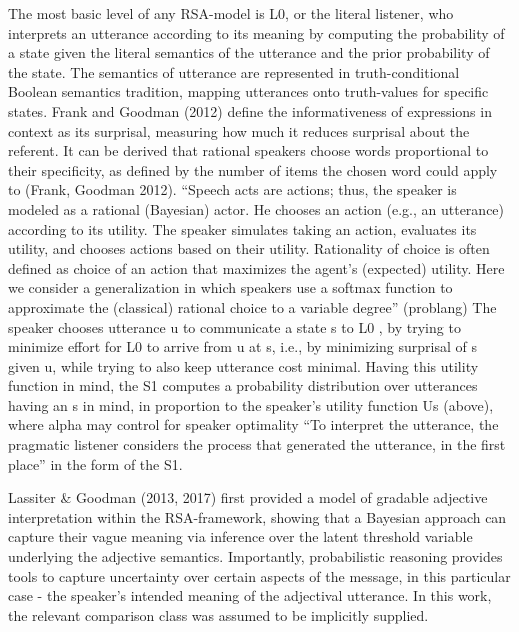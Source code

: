 The most basic level of any RSA-model is L0, or the literal listener, who interprets an utterance according to its meaning by computing the probability of a state given the literal semantics of the utterance and the prior probability of the state.  The semantics of utterance are represented in truth-conditional Boolean semantics tradition, mapping utterances onto truth-values for specific states. Frank and Goodman (2012) define the informativeness of expressions in context as its surprisal, measuring how much it reduces surprisal about the referent. It can be derived that rational speakers choose words proportional to their specificity, as defined by the number of items the chosen word could apply to (Frank, Goodman 2012).   
“Speech acts are actions; thus, the speaker is modeled as a rational (Bayesian) actor. He chooses an action (e.g., an utterance) according to its utility. The speaker simulates taking an action, evaluates its utility, and chooses actions based on their utility. Rationality of choice is often defined as choice of an action that maximizes the agent’s (expected) utility. Here we consider a generalization in which speakers use a softmax function to approximate the (classical) rational choice to a variable degree” (problang)
The speaker chooses utterance u to communicate a state s to L0 , by trying to minimize effort for L0 to arrive from u at s, i.e., by minimizing surprisal of s given u, while trying to also keep utterance cost minimal. Having this utility function in mind, the S1 computes a probability distribution over utterances having an s in mind, in proportion to the speaker’s utility function Us (above), where alpha may control for speaker optimality  
“To interpret the utterance, the pragmatic listener considers the process that generated the utterance, in the first place” in the form of the S1. 

Lassiter \& Goodman (2013, 2017) first provided a model of gradable adjective interpretation within the RSA-framework, showing that a Bayesian approach can capture their vague meaning via inference over the latent threshold variable underlying the adjective semantics. Importantly, probabilistic reasoning provides tools to capture uncertainty over certain aspects of the message, in this particular case - the speaker’s intended meaning of the adjectival utterance.  
In this work, the relevant comparison class was assumed to be implicitly supplied. 

